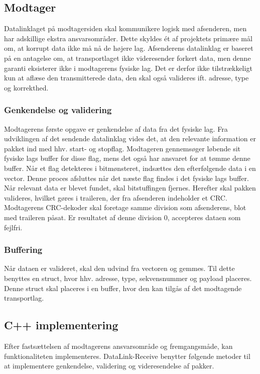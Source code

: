 \subsection{Modtager}
Datalinklaget på modtagersiden skal kommunikere logisk med afsenderen, men har adskillige ekstra ansvarsområder. Dette skyldes ét af projektets primære mål om, at korrupt data ikke må nå de højere lag. Afsenderens datalinklag er baseret på en antagelse om, at transportlaget ikke videresender forkert data, men denne garanti eksisterer ikke i modtagerens fysiske lag. Det er derfor ikke tilstrækkeligt kun at aflæse den transmitterede data, den skal også valideres ift. adresse, type og korrekthed.

\subsubsection{Genkendelse og validering}
Modtagerens første opgave er genkendelse af data fra det fysiske lag. Fra udviklingen af det sendende datalinklag vides det, at den relevante information er pakket ind med hhv. start- og stopflag. Modtageren gennemsøger løbende sit fysiske lags buffer for disse flag, mens det også har ansvaret for at tømme denne buffer. Når et flag detekteres i bitmønsteret, indsættes den efterfølgende data i en vector. Denne proces afsluttes når det næste flag findes i det fysiske lags buffer.
    Når relevant data er blevet fundet, skal bitstuffingen fjernes. Herefter skal pakken valideres, hvilket gøres i traileren, der fra afsenderen indeholder et CRC. Modtagerens CRC-dekoder skal foretage samme division som afsenderens, blot med traileren påsat. Er resultatet af denne division 0, accepteres dataen som fejlfri.
    
\subsubsection{Buffering}
Når dataen er valideret, skal den udvind fra vectoren og gemmes. Til dette benyttes en struct, hvor hhv. adresse, type, sekvensnummer og payload placeres. Denne struct skal placeres i en buffer, hvor den kan tilgås af det modtagende transportlag.

\subsection{C++ implementering}
Efter fastsættelsen af modtagerens ansvarsområde og fremgangsmåde, kan funktionaliteten implementeres.
	DataLink-Receive benytter følgende metoder til at implementere genkendelse, validering og videresendelse af pakker.

